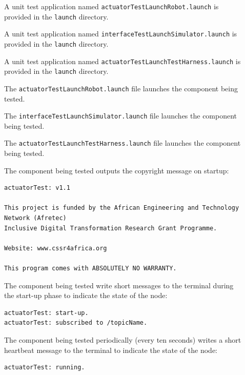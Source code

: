 \documentclass{CSSRforAfrica}
\newcommand{\checkboxChecked}{\fbox{\ding{51}}} %
\newcommand{\checkboxDashed}{\fbox{--}}         %
\begin{document}
\begin{description}

\item[\checkboxChecked] A unit test application named {\small \verb+actuatorTestLaunchRobot.launch+} is provided in the {\small \verb+launch+} directory.

\item[\checkboxChecked] A unit test application named {\small \verb+interfaceTestLaunchSimulator.launch+} is provided in the {\small \verb+launch+} directory.

\item[\checkboxDashed] A unit test application named {\small \verb+actuatorTestLaunchTestHarness.launch+} is provided in the {\small \verb+launch+} directory.

\item[\checkboxChecked] The {\small \verb+actuatorTestLaunchRobot.launch+} file  launches the component being tested.

\item[\checkboxChecked] The {\small \verb+interfaceTestLaunchSimulator.launch+} file  launches the component being tested.

\item[\checkboxDashed] The {\small \verb+actuatorTestLaunchTestHarness.launch+} file  launches the component being tested.

\item[\checkboxChecked] The component being tested outputs the copyright message on startup:  \\ 
{\scriptsize
\begin{verbatim}
actuatorTest: v1.1

This project is funded by the African Engineering and Technology Network (Afretec) 
Inclusive Digital Transformation Research Grant Programme. 

Website: www.cssr4africa.org

This program comes with ABSOLUTELY NO WARRANTY.
\end{verbatim}
}

\item[\checkboxChecked] The component being tested write short messages to the terminal  during the start-up phase to indicate the state of the node:
{\small
\begin{verbatim}
actuatorTest: start-up.
actuatorTest: subscribed to /topicName.
\end{verbatim}
} 

\item[\checkboxChecked] The component being tested periodically (every ten seconds) writes a short heartbeat message to the terminal to indicate the state of the node:
{\small
\begin{verbatim}
actuatorTest: running.
\end{verbatim}
}


\end{description}
\end{document}
